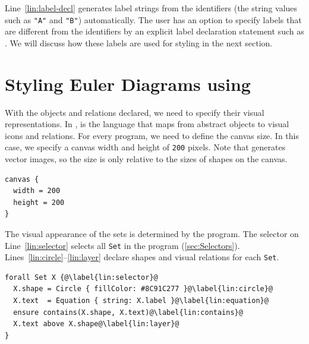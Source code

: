 Line~\ref{lin:label-decl} generates label strings from the \Substance identifiers (\eg the string values such as \texttt{"A"} and \texttt{"B"}) automatically. The user has an option to specify labels that are different from the identifiers by an explicit label declaration statement such as . We will discuss how these labels are used for styling in the next section.


\section{Styling Euler Diagrams using \Style}

With the objects and relations declared, we need to specify their visual representations. In \Penrose, \Style is the language that maps from abstract objects to visual icons and relations. For every \Style program, we need to define the canvas size. In this case, we specify a canvas width and height of \texttt{200} pixels. Note that \Penrose generates vector images, so the size is only relative to the sizes of shapes on the canvas. 

\begin{center}
\begin{mdframed}[style=STYCode]
\begin{lstlisting}[language=Sty-Sets-new,escapechar=@]
canvas {
  width = 200
  height = 200
}
\end{lstlisting}
\end{mdframed}
\end{center}

The visual appearance of the sets is determined by the \Style program. The selector on Line~\ref{lin:selector} selects all \texttt{Set} in the \Substance program (\cref{sec:Selectors}). Lines~\ref{lin:circle}--\ref{lin:layer} declare shapes and visual relations for each \texttt{Set}. 

\begin{center}
\begin{mdframed}[style=STYCode]
\begin{lstlisting}[language=Sty-Sets-new,escapechar=@]
forall Set X {@\label{lin:selector}@
  X.shape = Circle { fillColor: #8C91C277 }@\label{lin:circle}@
  X.text  = Equation { string: X.label }@\label{lin:equation}@
  ensure contains(X.shape, X.text)@\label{lin:contains}@
  X.text above X.shape@\label{lin:layer}@
}
\end{lstlisting}
\end{mdframed}
\end{center}

